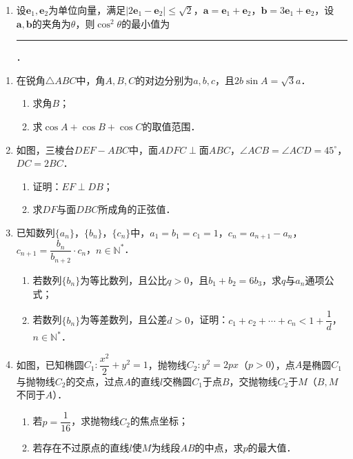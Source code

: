\begin{description}
\begin{enumerate}[leftmargin=5pt]
        \item 设$\bm{e}_{1},\bm{e}_{2}$为单位向量，满足$|2\bm{e}_{1}-\bm{e}_{2}|\leqslant\sqrt{2}$，$\bm{a}=\bm{e}_{1}+\bm{e}_{2}$，$\bm{b}=3\bm{e}_{1}+\bm{e}_{2}$，设$\bm{a},\bm{b}$的夹角为$\theta$，则$\cos^{2}\theta$的最小值为\rule[-0.3ex]{3em}{0.4pt}．
    \end{enumerate}
    \item[三、解答题]
    \begin{enumerate}[leftmargin=5pt]
      \addtocounter{enumi}{+17}
        \item 在锐角$\triangle ABC$中，角$A,B,C$的对边分别为$a,b,c$，且$2b\sin A=\sqrt{3}a$．
        \begin{enumerate}[label=(\arabic*)]
            \item 求角$B$；
            \item 求$\cos A+\cos B+\cos C$的取值范围．
        \end{enumerate}
        \item 如图，三棱台$DEF-ABC$中，面$ADFC\perp$面$ABC$，$\angle ACB=\angle ACD=45^{\circ}$，$DC=2BC$．
        \begin{enumerate}[label=(\arabic*)]
            \item 证明：$EF\perp DB$；
            \item 求$DF$与面$DBC$所成角的正弦值．
        \end{enumerate}        \item 已知数列$\{a_{n}\}$，$\{b_{n}\}$，$\{c_{n}\}$中，$a_{1}=b_{1}=c_{1}=1$，$c_{n}=a_{n+1}-a_{n}$，$c_{n+1}=\dfrac{b_{n}}{b_{n+2}}\cdot c_{n}$，$n\in\mathbb{N}^{*}$．
        \begin{enumerate}[label=(\arabic*)]
            \item 若数列$\{b_{n}\}$为等比数列，且公比$q>0$，且$b_{1}+b_{2}=6b_{3}$，求$q$与$a_{n}$通项公式；
            \item 若数列$\{b_{n}\}$为等差数列，且公差$d>0$，证明：$c_{1}+c_{2}+\cdots+c_{n}<1+\dfrac{1}{d}$，$n\in\mathbb{N}^{*}$．
        \end{enumerate}
        \item 如图，已知椭圆$C_{1}:\dfrac{x^{2}}{2}+y^{2}=1$，抛物线$C_{2}:y^{2}=2px$（$p>0$），点$A$是椭圆$C_{1}$与抛物线$C_{2}$的交点，过点$A$的直线$l$交椭圆$C_{1}$于点$B$，交抛物线$C_{2}$于$M$（$B,M$不同于$A$）．
        \begin{enumerate}[label=(\arabic*)]
            \item 若$p=\dfrac{1}{16}$，求抛物线$C_{2}$的焦点坐标；
            \item 若存在不过原点的直线$l$使$M$为线段$AB$的中点，求$p$的最大值．

\end{enumerate}
\end{enumerate}
\end{description}

